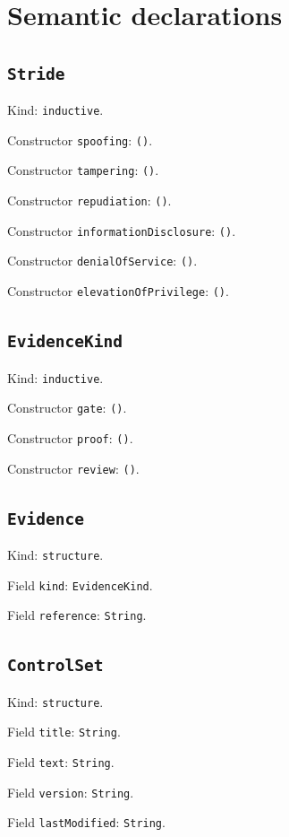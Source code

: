 \documentclass[11pt]{article}
\begin{document}
\section*{Semantic declarations}
\subsection*{\texttt{Stride}}
\noindent Kind: \texttt{inductive}.\par
\noindent Constructor \texttt{spoofing}: \texttt{()}.\par
\noindent Constructor \texttt{tampering}: \texttt{()}.\par
\noindent Constructor \texttt{repudiation}: \texttt{()}.\par
\noindent Constructor \texttt{informationDisclosure}: \texttt{()}.\par
\noindent Constructor \texttt{denialOfService}: \texttt{()}.\par
\noindent Constructor \texttt{elevationOfPrivilege}: \texttt{()}.\par
\subsection*{\texttt{EvidenceKind}}
\noindent Kind: \texttt{inductive}.\par
\noindent Constructor \texttt{gate}: \texttt{()}.\par
\noindent Constructor \texttt{proof}: \texttt{()}.\par
\noindent Constructor \texttt{review}: \texttt{()}.\par
\subsection*{\texttt{Evidence}}
\noindent Kind: \texttt{structure}.\par
\noindent Field \texttt{kind}: \texttt{EvidenceKind}.\par
\noindent Field \texttt{reference}: \texttt{String}.\par
\subsection*{\texttt{ControlSet}}
\noindent Kind: \texttt{structure}.\par
\noindent Field \texttt{title}: \texttt{String}.\par
\noindent Field \texttt{text}: \texttt{String}.\par
\noindent Field \texttt{version}: \texttt{String}.\par
\noindent Field \texttt{lastModified}: \texttt{String}.\par
\end{document}
